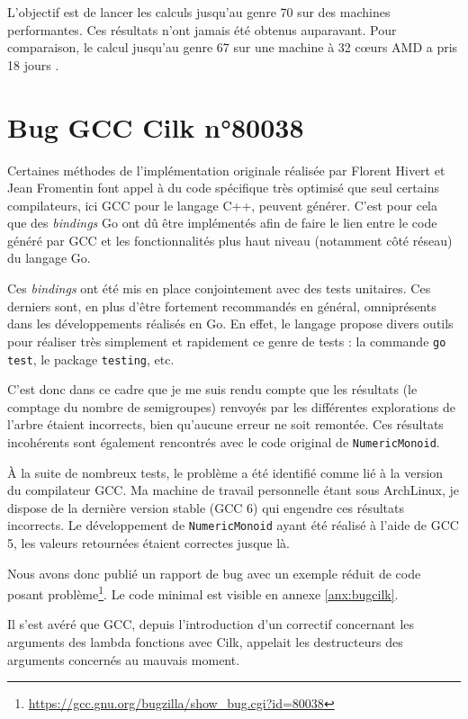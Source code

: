 \documentclass[12pt,a4paper]{report}
\begin{document}
L'objectif est de lancer les calculs jusqu'au genre 70 sur des machines performantes. Ces résultats n'ont jamais été obtenus auparavant. Pour comparaison, le calcul jusqu'au genre 67 sur une machine à 32 c\oe{}urs AMD a pris 18 jours \cite{exploring-ns}.

\section{Bug GCC Cilk n°80038}
Certaines méthodes de l'implémentation originale réalisée par Florent Hivert et Jean Fromentin font appel à du code spécifique très optimisé que seul certains compilateurs, ici GCC pour le langage C++, peuvent générer. C'est pour cela que des \emph{bindings} Go ont dû être implémentés afin de faire le lien entre le code généré par GCC et les fonctionnalités plus haut niveau (notamment côté réseau) du langage Go.

Ces \emph{bindings} ont été mis en place conjointement avec des tests unitaires. Ces derniers sont, en plus d'être fortement recommandés en général, omniprésents dans les développements réalisés en Go. En effet, le langage propose divers outils pour réaliser très simplement et rapidement ce genre de tests : la commande \texttt{go test}, le package \texttt{testing}, etc.

C'est donc dans ce cadre que je me suis rendu compte que les résultats (le comptage du nombre de semigroupes) renvoyés par les différentes explorations de l'arbre étaient incorrects, bien qu'aucune erreur ne soit remontée. Ces résultats incohérents sont également rencontrés avec le code original de \texttt{NumericMonoid}.

À la suite de nombreux tests, le problème a été identifié comme lié à la version du compilateur GCC. Ma machine de travail personnelle étant sous ArchLinux, je dispose de la dernière version stable (GCC 6) qui engendre ces résultats incorrects. Le développement de \texttt{NumericMonoid} ayant été réalisé à l'aide de GCC 5, les valeurs retournées étaient correctes jusque là.

Nous avons donc publié un rapport de bug avec un exemple réduit de code posant problème\footnote{\url{https://gcc.gnu.org/bugzilla/show_bug.cgi?id=80038}}. Le code minimal est visible en annexe \ref{anx:bugcilk}.

Il s'est avéré que GCC, depuis l'introduction d'un correctif concernant les arguments des lambda fonctions avec Cilk, appelait les destructeurs des arguments concernés au mauvais moment.
\end{document}
